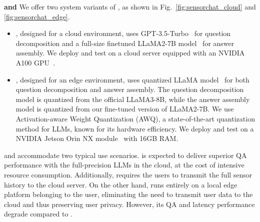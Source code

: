 \textbf{\MethodC and \MethodE} We offer two system variants of \Method, as shown in Fig.~\ref{fig:sensorchat_cloud} and \ref{fig:sensorchat_edge}.
\begin{itemize}
    \item \textbf{\MethodC}, designed for a cloud environment, uses GPT-3.5-Turbo~\cite{gpt-3.5} for question decomposition and a full-size finetuned LLaMA2-7B model~\cite{touvron2023llama} for answer assembly. We deploy and test \Method on a cloud server equipped with an NVIDIA A100 GPU~\cite{a100}.
    \item \textbf{\MethodE}, designed for an edge environment, uses quantized LLaMA model~\cite{touvron2023llama} for both question decomposition and answer assembly. The question decomposition model is quantized from the official LLaMA3-8B, while the answer assembly model is quantized from our fine-tuned version of LLaMA2-7B. 
    We use Activation-aware Weight Quantization (AWQ), a state-of-the-art quantization method for LLMs, known for its hardware efficiency. We deploy and test \MethodE on a NVIDIA Jetson Orin NX module~\cite{jetsonorin} with 16GB RAM.
\end{itemize}
\MethodC and \MethodE accommodate two typical use scenarios. \MethodC is expected to deliver superior QA performance with the full-precision LLMs in the cloud, at the cost of intensive resource consumption. Additionally, \MethodC requires the users to transmit the full sensor history to the cloud server.
On the other hand, \MethodE runs entirely on a local edge platform belonging to the user, eliminating the need to transmit user data to the cloud and thus preserving user privacy. However, its QA and latency performance degrade compared to \MethodC.  


